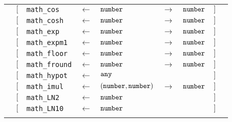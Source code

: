 \begin{tabular}[fragile]{lllllllll}
& $[$ & \texttt{math\_cos} & $\leftarrow$  & $\texttt{number}$ & $\rightarrow$ & $\texttt{number}$ & $]$ \\
& $[$ & \texttt{math\_cosh} & $\leftarrow$  & $\texttt{number}$ & $\rightarrow$ & $\texttt{number}$ & $]$ \\
& $[$ & \texttt{math\_exp} & $\leftarrow$  & $\texttt{number}$ & $\rightarrow$ & $\texttt{number}$ & $]$ \\
& $[$ & \texttt{math\_expm1} & $\leftarrow$  & $\texttt{number}$ & $\rightarrow$ & $\texttt{number}$ & $]$ \\
& $[$ & \texttt{math\_floor} & $\leftarrow$  & $\texttt{number}$ & $\rightarrow$ & $\texttt{number}$ & $]$ \\
& $[$ & \texttt{math\_fround} & $\leftarrow$  & $\texttt{number}$ & $\rightarrow$ & $\texttt{number}$ & $]$ \\
& $[$ & \texttt{math\_hypot} & $\leftarrow$  & $\texttt{any}$ & & & $]$ \\
& $[$ & \texttt{math\_imul} & $\leftarrow$  & $(\texttt{number}, \texttt{number})$ & $\rightarrow$ & $\texttt{number}$ & $]$ \\
& $[$ & \texttt{math\_LN2} & $\leftarrow$  & $\texttt{number}$ & & & $]$ \\
& $[$ & \texttt{math\_LN10} & $\leftarrow$  & $\texttt{number}$ & & & $]$ \\
& \end{tabular}

